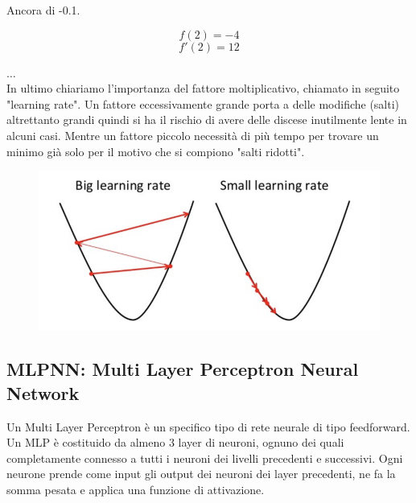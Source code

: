 \documentclass[12pt]{article}
\begin{document}
Ancora di -0.1.

\begin{equation}f(2)=-4\end{equation}
\begin{equation}f'(2)=12\end{equation}

$\dots$\\

In ultimo chiariamo l'importanza del fattore moltiplicativo,
chiamato in seguito "learning rate". Un fattore eccessivamente grande 
porta a delle modifiche (salti) altrettanto grandi quindi si ha il rischio
di avere delle discese inutilmente lente in alcuni casi.
Mentre un fattore piccolo necessità di più tempo per trovare
un minimo già solo per il motivo che si compiono "salti ridotti".

\begin{figure}[H]{}
    \centering
    \includegraphics[scale=0.5]{../images/lr.png}
    \label{fig:cc}
\end{figure}



\subsection{MLPNN: Multi Layer Perceptron Neural Network}

Un Multi Layer Perceptron è un specifico tipo di rete neurale di
tipo feedforward. Un MLP è costituido da almeno 3 layer di
neuroni, ognuno dei quali completamente connesso a tutti i neuroni
dei livelli precedenti e successivi.
Ogni neurone prende come input gli output dei neuroni dei layer
precedenti, ne fa la somma pesata e applica una funzione di attivazione.
\end{document}
